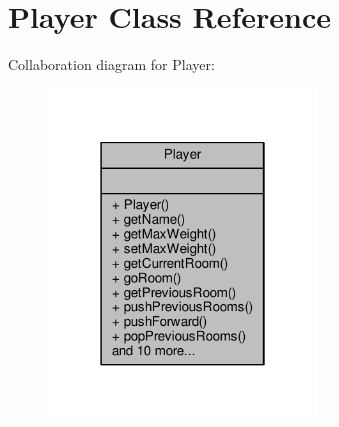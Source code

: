 \hypertarget{classPlayer}{\section{Player Class Reference}
\label{classPlayer}
}


Collaboration diagram for Player\-:
\nopagebreak
\begin{figure}[H]
\begin{center}
\leavevmode
\includegraphics[width=202pt]{classPlayer__coll__graph}
\end{center}
\end{figure}
